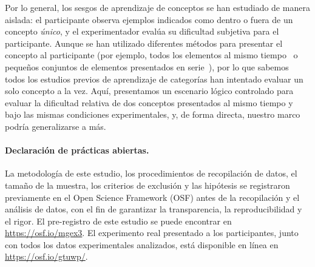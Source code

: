 Por lo general, los sesgos de aprendizaje de conceptos se han estudiado de manera aislada: el participante observa ejemplos indicados como dentro o fuera de un concepto \textit{único}, y el experimentador evalúa su dificultad subjetiva para el participante. Aunque se han utilizado diferentes métodos para presentar el concepto al participante (por ejemplo, todos los elementos al mismo tiempo~\cite{tano2020towards, kemp2012exploring} o pequeños conjuntos de elementos presentados en serie~\cite{piantadosi2016logical}), por lo que sabemos todos los estudios previos de aprendizaje de categorías han intentado evaluar un solo concepto a la vez. Aquí, presentamos un escenario lógico controlado para evaluar la dificultad relativa de dos conceptos presentados al mismo tiempo y bajo las mismas condiciones experimentales, y, de forma directa, nuestro marco podría generalizarse a más.



\paragraph{Declaración de prácticas abiertas.} 
La metodología de este estudio, los procedimientos de recopilación de datos, el tamaño de la muestra, los criterios de exclusión y las hipótesis se registraron previamente en el Open Science Framework (OSF) antes de la recopilación y el análisis de datos, con el fin de garantizar la transparencia, la reproducibilidad y el rigor. El pre-registro de este estudio se puede encontrar en \url{https://osf.io/mgex3}. El experimento real presentado a los participantes, junto con todos los datos experimentales analizados, está disponible en línea en \url{https://osf.io/gtuwp/}.

% 
%



